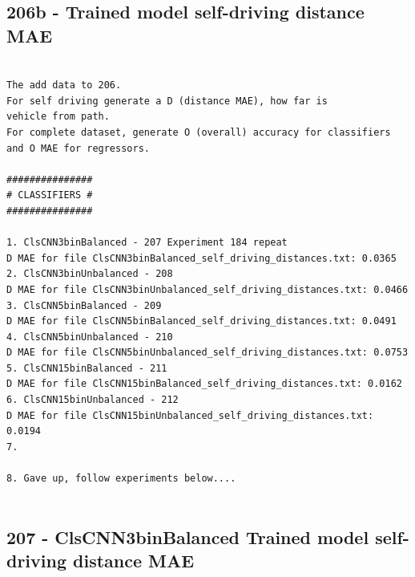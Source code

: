 \subsection{206b - Trained model self-driving distance MAE}
\label{app_res:206b}

\begin{verbatim}

The add data to 206.
For self driving generate a D (distance MAE), how far is
vehicle from path.
For complete dataset, generate O (overall) accuracy for classifiers
and O MAE for regressors.

###############
# CLASSIFIERS #
###############

1. ClsCNN3binBalanced - 207 Experiment 184 repeat
D MAE for file ClsCNN3binBalanced_self_driving_distances.txt: 0.0365
2. ClsCNN3binUnbalanced - 208
D MAE for file ClsCNN3binUnbalanced_self_driving_distances.txt: 0.0466
3. ClsCNN5binBalanced - 209
D MAE for file ClsCNN5binBalanced_self_driving_distances.txt: 0.0491
4. ClsCNN5binUnbalanced - 210
D MAE for file ClsCNN5binUnbalanced_self_driving_distances.txt: 0.0753
5. ClsCNN15binBalanced - 211
D MAE for file ClsCNN15binBalanced_self_driving_distances.txt: 0.0162
6. ClsCNN15binUnbalanced - 212
D MAE for file ClsCNN15binUnbalanced_self_driving_distances.txt: 0.0194
7.

8. Gave up, follow experiments below....


\end{verbatim}

\subsection{207 - ClsCNN3binBalanced Trained model self-driving distance MAE}
\label{app_res:207}

